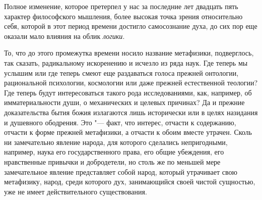 Полное изменение, которое претерпел у нас за
последние лет двадцать пять характер философского мышления, более высокая
точка зрения относительно себя, которой в этот период времени достигло
самосознание духа, до сих пор еще оказали мало влияния на облик {\em логики}.

То, что до этого промежутка времени носило название метафизики, подверглось,
так сказать, радикальному искоренению и исчезло из ряда наук. Где теперь мы
услышим или где теперь смеют еще раздаваться голоса прежней онтологии,
рациональной психологии, космологии или даже прежней естественной теологии?
Где теперь будут интересоваться такого рода исследованиями, как, например,
об имматериальности души, о механических и целевых причинах? Да и прежние
доказательства бытия божия излагаются лишь исторически или в целях
назидания и душевного ободрения. Это "--- факт, что интерес, отчасти к
содержанию, отчасти к форме прежней метафизики, а отчасти к обоим вместе
утрачен. Сколь ни замечательно явление народа, для которого сделались
непригодными, например, наука его государственного права, его общие
убеждения, его нравственные привычки и добродетели, но столь же по меньшей
мере замечательное явление представляет собой народ, который утрачивает
свою метафизику, народ, среди которого дух, занимающийся своей чистой
сущностью, уже не имеет действительного существования.


